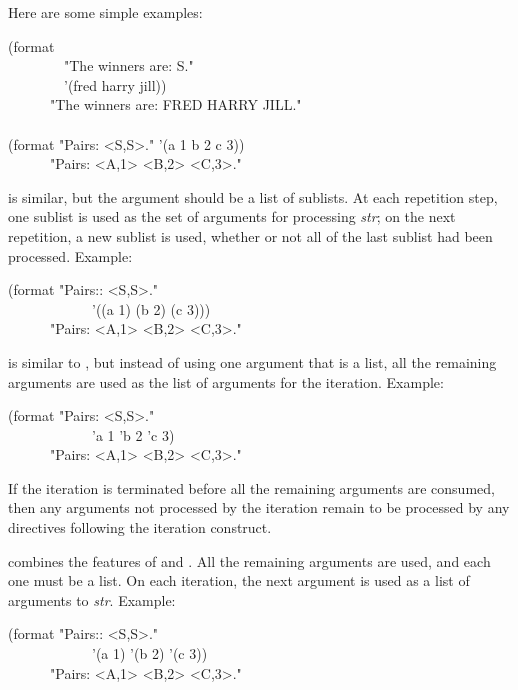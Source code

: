 \begin{flushdesc}
Here are some simple examples:
\begin{lisp}
(format {\false} \\
~~~~~~~~"The winners are:{\Xtilde}{\Xlbrace} {\Xtilde}S{\Xtilde}{\Xrbrace}." \\
~~~~~~~~'(fred harry jill)) \\
~~~~~\EV\ "The winners are: FRED HARRY JILL." \\
\\
(format {\false} "Pairs:{\Xtilde}{\Xlbrace} <{\Xtilde}S,{\Xtilde}S>{\Xtilde}{\Xrbrace}." '(a 1 b 2 c 3)) \\
~~~~~\EV\ "Pairs: <A,1> <B,2> <C,3>."
\end{lisp}

 is similar, but the argument should be a list of sublists.
At each repetition step, one sublist is used as the set of arguments for
processing {\it str}; on the next repetition, a new sublist is used, whether
or not all of the last sublist had been processed.  Example:
\begin{lisp}
(format {\false} "Pairs:{\Xtilde}:{\Xlbrace} <{\Xtilde}S,{\Xtilde}S>{\Xtilde}{\Xrbrace}." \\
~~~~~~~~~~~~'((a 1) (b 2) (c 3))) \\
~~~~~\EV\ "Pairs: <A,1> <B,2> <C,3>."
\end{lisp}

 is similar to , but instead of
using one argument that is a list, all the remaining arguments
are used as the list of arguments for the iteration.
Example:
\begin{lisp}
(format {\false} "Pairs:{\Xtilde}{\Xatsign}{\Xlbrace} <{\Xtilde}S,{\Xtilde}S>{\Xtilde}{\Xrbrace}." \\
~~~~~~~~~~~~'a 1 'b 2 'c 3) \\
~~~~~\EV\ "Pairs: <A,1> <B,2> <C,3>."
\end{lisp}
If the iteration is terminated before all the remaining arguments are
consumed, then any arguments not processed by the iteration remain to be
processed by any directives following the iteration construct.

combines the features of 
and .
All the remaining arguments
are used, and each one must be a list.
On each iteration, the next argument is used as a list of arguments to {\it str}.
Example:
\begin{lisp}
(format {\false} "Pairs:{\Xtilde}:{\Xatsign}{\Xlbrace} <{\Xtilde}S,{\Xtilde}S>{\Xtilde}{\Xrbrace}." \\
~~~~~~~~~~~~'(a 1) '(b 2) '(c 3)) \\
~~~~~\EV\ "Pairs: <A,1> <B,2> <C,3>."
\end{lisp}


\end{flushdesc}
